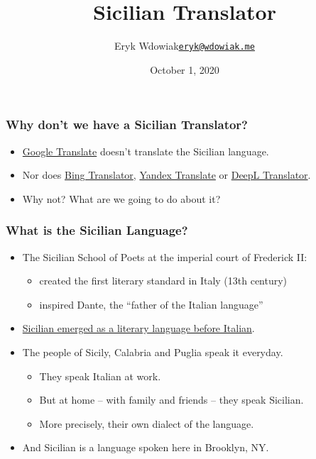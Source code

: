 \documentclass{beamer}
\title{Sicilian Translator}
\author{\texorpdfstring{Eryk Wdowiak\newline\href{eryk@wdowiak.me}{\texttt{eryk@wdowiak.me}}}{Eryk Wdowiak}}
\institute{Project Napizia}
\date{October 1, 2020}
\begin{document}

\begin{frame}
  \titlepage
\end{frame}


\begin{frame}
  \frametitle{Why don't we have a Sicilian Translator?}
  \vspace{-1.0em}
  \begin{itemize}
  \item \href{https://translate.google.com/}{Google Translate} doesn't translate the Sicilian language.
  \item Nor does \href{https://www.bing.com/translator/}{Bing Translator},
    \href{https://translate.yandex.com/}{Yandex Translate} or
    \href{https://www.deepl.com/translator}{DeepL Translator}.
    \vspace{1em}
    \item Why not?  What are we going to do about it?
  \end{itemize} 
\end{frame}


\begin{frame}
  \frametitle{What is the Sicilian Language?}
  \vspace{-1.0em}
  \begin{itemize}
  \item The Sicilian School of Poets at the imperial court of Frederick II:
    \begin{itemize}
    \item created the first literary standard in Italy (13th century)
    \item inspired Dante, the ``father of the Italian language''
    \end{itemize}
  \vspace{0.65em}
  \item \underline{Sicilian emerged as a literary language before Italian}.
  \vspace{1em}
  \item The people of Sicily, Calabria and Puglia speak it everyday.
    \begin{itemize}
    \item They speak Italian at work.
    \item But at home -- with family and friends -- they speak Sicilian.
    \item More precisely, their own dialect of the language.
    \end{itemize}
  \vspace{0.65em}
  \item And Sicilian is a language spoken here in Brooklyn, NY.
  \end{itemize} 
\end{frame}
\end{document}
